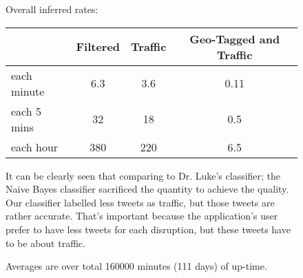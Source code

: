 \begin{figure}[h!]
Overall inferred rates:
\begin{center}
    \begin{tabular}{| l || c | c | c |}
    \hline
        & Filtered & Traffic & Geo-Tagged and Traffic\\ \hline \hline
        each minute & 6.3 & 3.6 & 0.11 \\ \hline
		each 5 mins & 32 &  18 & 0.5 \\ \hline
		each hour & 380 & 220 & 6.5 \\ \hline
    \end{tabular}
    \caption{Averages are over total 160000 minutes (111 days) of up-time.}
    \label{fig:metricsLuke}
\end{center}
It can be clearly seen that comparing to Dr. Luke's classifier; the Naive Bayes classifier sacrificed the quantity to achieve the quality. Our classifier labelled less tweets as traffic, but those tweets are rather accurate. That's important because the application's user prefer to have less tweets for each disruption, but these tweets have to be about traffic. 
\end{figure}
